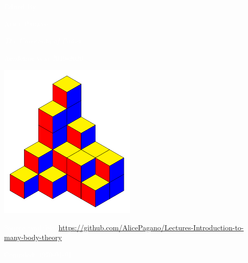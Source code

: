 \begin{titlepage}
	
	\textcolor{white}{Edited By}
	
	\vspace{0.5\baselineskip} %
	
	\textcolor{white}{\scshape\Large Alice Pagano \\} %
	
	\vspace{0.5\baselineskip} %
	
	\textcolor{white}{\textit{The University of Padua } }%
	
	\vspace{0.5\baselineskip}
	
	\textcolor{white}{\small Academic year 2019-2020}
	
	\vspace{2cm}
	
	\includegraphics[width=6.5cm]{../frontespizio/image.pdf}
	
	\vspace{2cm}
	
	\textcolor{white}{Source available: \url{https://github.com/AlicePagano/Lectures-Introduction-to-many-body-theory}
	\vspace{2cm}}
	
	\textcolor{white}{\footnotesize Compiled: \today} %
	

\end{titlepage}

\clearpage{\pagestyle{empty}\cleardoublepage}
